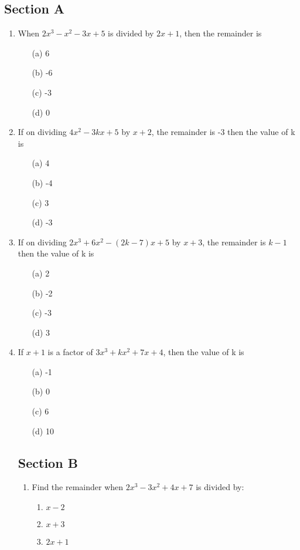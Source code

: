 \documentclass[12pt]{article}
\begin{document}
	\begin{multicols}{2}
		\section*{Section A}
	
	\begin{enumerate}
	\item When $2x^3 - x^2 - 3x + 5$ is divided by $2x + 1$, then the remainder is
	\begin{enumerate}
	\item[(a)] 6
	\item[(b)] -6
	\item[(c)] -3
	\item[(d)] 0
	\end{enumerate}
	\item If on dividing $4x^2 - 3kx + 5$ by $x + 2$, the remainder is -3 then the value of k is
	\begin{enumerate}
	\item[(a)] 4
	\item[(b)] -4
	\item[(c)] 3
	\item[(d)] -3
	\end{enumerate}
	\item If on dividing $2x^3 + 6x^2 - (2k - 7)x + 5$ by $x + 3$, the remainder is $k - 1$ then the value of k is
	\begin{enumerate}
	\item[(a)] 2
	\item[(b)] -2
	\item[(c)] -3
	\item[(d)] 3
	\end{enumerate}
	\item If $x + 1$ is a factor of $3x^3 + kx^2 + 7x + 4$, then the value of k is
	\begin{enumerate}
	\item[(a)] -1
	\item[(b)] 0
	\item[(c)] 6
	\item[(d)] 10
	\end{enumerate}
	\section*{Section B}
	\begin{enumerate}
	\item Find the remainder when \( 2x^3 - 3x^2 + 4x + 7 \) is divided by:
	\begin{enumerate}
	\item \( x - 2 \)
	\item \( x + 3 \)
	\item \( 2x + 1 \)
	\end{enumerate}
	

\end{enumerate}
\end{enumerate}
\end{multicols}
\end{document}
